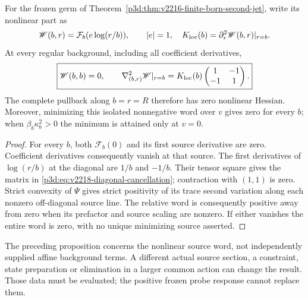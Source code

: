 \documentclass[12pt,a4paper]{article}
\begin{document}
\begin{proposition}
\label{p3d:prop:v2218-diagonal-cancellation}
For the frozen germ of
Theorem~\ref{p3d:thm:v2216-finite-born-second-jet}, write its nonlinear
part as
\[
 \mathscr W(b,r)=\mathcal F_b(e\log(r/b)),\qquad |e|=1,
 \quad K_{\rm loc}(b)=\partial_r^2\mathscr W(b,r)|_{r=b}.
\]
At every regular background, including all coefficient derivatives,
\begin{equation}
 \boxed{\mathscr W(b,b)=0,\qquad
 \nabla^2_{(b,r)}\mathscr W|_{r=b}
 =K_{\rm loc}(b)
 \begin{pmatrix}1&-1\\-1&1\end{pmatrix}.}
 \label{p3d:eq:v2218-diagonal-cancellation}
\end{equation}
The complete pullback along $b=r=R$ therefore has zero nonlinear
Hessian.  Moreover, minimizing this isolated nonnegative word over
$v$ gives zero for every $b$; when $\beta_b\kappa_b^2>0$ the minimum
is attained only at $v=0$.
\end{proposition}
\begin{proof}
For every $b$, both $\mathcal F_b(0)$ and its first source derivative
are zero.  Coefficient derivatives consequently vanish at that source.
The first derivatives of $\log(r/b)$ at the diagonal are $1/b$ and
$-1/b$.  Their tensor square gives the matrix in
\eqref{p3d:eq:v2218-diagonal-cancellation}; contraction with $(1,1)$
is zero.  Strict convexity of $\Psi$ gives strict positivity of its
trace second variation along each nonzero off-diagonal source line.
The relative word is consequently positive away from zero when its
prefactor and source scaling are nonzero.  If either vanishes the
entire word is zero, with no unique minimizing source asserted.
\end{proof}

The preceding proposition concerns the nonlinear source word, not
independently supplied affine background terms.  A different actual
source section, a constraint, state preparation or elimination in a
larger common action can change the result.  Those data must be
evaluated; the positive frozen probe response cannot replace them.
\end{document}
